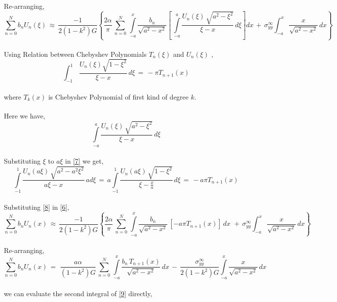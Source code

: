 \documentclass[authoryear,12pt]{elsarticle}
\begin{document}
		Re-arranging,
		\begin{equation}\label{6}
			\sum_{n=0}^{N} b_n U_n(\xi)\,\approx\,\frac{-1}{2(1-k^2)G}\left\{\frac{2\alpha}{\pi}\,\sum_{n=0}^{N}\,\int\limits_{-a}^x\frac{b_n}{\sqrt{a^2 - x^2}}\left[\,\int\limits_{-a}^a \frac{U_n(\xi)\,\sqrt{a^2 - \xi ^2}}{\xi-x}\,d\xi\right] dx\,+\,\sigma^{\infty}_{yy}\int_{-a}^x \frac{x}{\sqrt{a^2-x^2}}\,dx\right\}
		\end{equation}
		\\
		Using Relation between Chebyshev Polynomials \(T_{n}(\xi)\) and \(U_{n}(\xi)\) \citep{cheby},
		\begin{equation*}
			\int_{-1}^1\,\frac{U_n(\xi) \sqrt{1-\xi^2}}{\xi-x}\,d\xi\,=\,-\pi T_{n+1}(x)
		\end{equation*}
		\\
		where \(T_{k}(x)\) is Chebyshev Polynomial of first kind of degree \(k\).
		\\
		\\
		Here we have, 
		\begin{equation}\label{7}
			\int\limits_{-a}^a \frac{U_n(\xi)\,\sqrt{a^2 - \xi^2}}{\xi-x}\,d\xi
		\end{equation}
		\\
		Substituting \(\xi\) to \(a\xi\) in \cref{7} we get,
		\begin{equation}\label{8}
			\int\limits_{-1}^1 \frac{U_n(a\xi)\,\sqrt{a^2 - a^2 \xi ^2}}{a \xi-x}\,a d\xi \,=\, a \int\limits_{-1}^1 \frac{U_n(a\xi)\,\sqrt{1 - \xi^2}}{\xi-\frac{x}{a}}\, d\xi \,=\,-a\pi T_{n+1}(x)
		\end{equation}
		\\
		Substituting \eqref{8} in \eqref{6},
		\begin{equation*}
			\sum_{n=0}^{N} b_n U_n(x)\,\approx\,\frac{-1}{2(1-k^2)G}\left\{\frac{2\alpha}{\pi}\,\sum\limits_{n=0}^{N}\,\int\limits_{-a}^x\frac{b_n}{\sqrt{a^2 - x^2}}\,\left[-a \pi T_{n+1}(x) \right]\,dx\,\,+\,\sigma^{\infty}_{yy}\int_{-a}^x \frac{x}{\sqrt{a^2-x^2}}\,dx\right\}
		\end{equation*}
		\\
		Re-arranging,
		\begin{equation}\label{9}
			\sum_{n=0}^{N} b_n U_n(x)\,=\,\,\frac{a \alpha}{(1-k^2)G}\,\sum_{n=0}^{N}\,\int\limits_{-a}^x\frac{b_n\, T_{n+1}(x)}{\sqrt{a^2 - x^2}}\,dx\,-\,\frac{\sigma^{\infty}_{yy}}{2(1-k^2)G}\int\limits_{-a}^x \frac{x}{\sqrt{a^2-x^2}}\,dx
		\end{equation}
		\\
		we can evaluate the second integral of \cref{9} directly,
\end{document}
